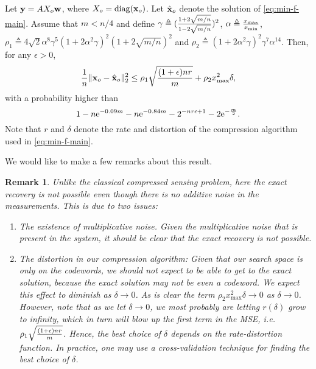 \documentclass[onecolumn]{IEEEtran}
\newcommand{\wv}{{\bf w}}
\newcommand{\xvh}{\hat{\xv}}
\newtheorem{remark}{Remark}
\begin{document}
\begin{theorem}\label{thm:main-result}
Let $\yv=AX_o\wv$, where $X_o=\mathop{\rm diag}\nolimits({{\bf x}_o})$. Let $\xvh_o$ denote the solution of \eqref{eq:min-f-main}. Assume that $m<n/4$ and define $\gamma\triangleq ({1+2\sqrt{m/n}\over 1-2\sqrt{m/n}})^2$, $\alpha \triangleq {x_{\max}\over x_{\min}}$, $\rho_1\triangleq4\sqrt{2}\alpha^8\gamma^5(1+2\alpha^2\gamma)^2(1+2\sqrt{m/n})^2$ and $\rho_2\triangleq (1+2\alpha^2\gamma)^2\gamma^7\alpha^{14}$. 
Then, for any $\epsilon>0$, 
\begin{align}
 {1\over n} \| \xv_o- \xvh_o\|_2^2 \leq \rho_1 \sqrt{(1+\epsilon) nr  \over m} + \rho_2 x_{\max}^2\delta,
\end{align}
with a probability higher than
\[
1-n{\rm e}^{-0.09m}-n{\rm e}^{-0.84m}-2^{-nr \epsilon+1}-2{\rm e}^{-{m\over 2}}.
\]
Note that $r$ and $\delta$ denote the rate and distortion of the compression algorithm used in \eqref{eq:min-f-main}. 
\end{theorem}

We would like to make a few remarks about this result.

\begin{remark}
Unlike the classical compressed sensing problem, here the exact recovery is not possible even though there is no additive noise in the measurements. This is due to two issues: 
\begin{enumerate}
\item The existence of multiplicative noise. Given the multiplicative noise that is present in the system, it should be clear that the exact recovery is not possible. 

\item The distortion in our compression algorithm: Given that our search space is only on the codewords, we should not expect to be able to get to the exact solution, because the exact solution may not be even a codeword. We expect this effect to diminish as $\delta \rightarrow 0$. As is clear the term $\rho_2 x_{\max}^2\delta \rightarrow 0$ as $\delta \rightarrow 0$. However, note that as we let $\delta \rightarrow 0$, we most probably are letting $r(\delta)$ grow to infinity, which in turn will blow up the first term in the MSE, i.e.  $\rho_1 \sqrt{(1+\epsilon) nr  \over m}$. Hence, the best choice of $\delta$ depends on the rate-distortion function. In practice, one may use a cross-validation technique for finding the best choice of $\delta$. 

\end{enumerate}
\end{remark}
\end{document}
